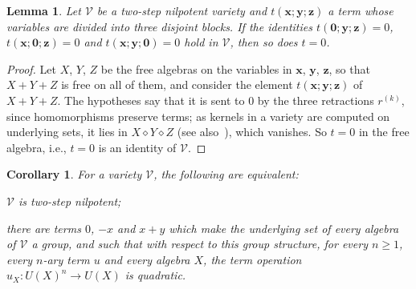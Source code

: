 \documentclass[reqno,a4paper]{amsart}
\theoremstyle{plain}
\newtheorem{lemma}[subsection]{Lemma}
\newtheorem{corollary}[subsection]{Corollary}
\theoremstyle{definition}
\newcommand{\V}{\ensuremath{\mathcal{V}}}
\newcommand{\U}{\ensuremath{U}}
\newcommand{\cosmash}{\ensuremath{\diamond}}
\begin{document}
\begin{lemma}\label{lem:trireduced}
  Let \(\V\) be a two-step nilpotent variety and \(t(\mathbf{x};\mathbf{y};\mathbf{z})\) a term whose variables are divided into three disjoint blocks. If the identities \(t(\mathbf{0};\mathbf{y};\mathbf{z})=0\), \(t(\mathbf{x};\mathbf{0};\mathbf{z})=0\) and \(t(\mathbf{x};\mathbf{y};\mathbf{0})=0\) hold in \(\V\), then so does \(t=0\).
\end{lemma}

\begin{proof}
  Let \(X\), \(Y\), \(Z\) be the free algebras on the variables in \(\mathbf{x}\), \(\mathbf{y}\), \(\mathbf{z}\), so that \(X+Y+Z\) is free on all of them, and consider the element \(t(\mathbf{x};\mathbf{y};\mathbf{z})\) of \(X+Y+Z\). The hypotheses say that it is sent to \(0\) by the three retractions \(r^{(k)}\), since homomorphisms preserve terms; as kernels in a variety are computed on underlying sets, it lies in \(X\cosmash Y\cosmash Z\) (see also~\cite[Example~2.6]{HVdL}), which vanishes. So \(t=0\) in the free algebra, i.e., \(t=0\) is an identity of \(\V\).
\end{proof}

\begin{corollary}\label{cor:quadratic-terms}
  For a variety \(\V\), the following are equivalent:
  \begin{tfae}
    \item\label{it:qt-nil} \(\V\) is two-step nilpotent;
    \item\label{it:qt-quad} there are terms \(0\), \(-x\) and \(x+y\) which make the underlying set of every algebra of \(\V\) a group, and such that with respect to this group structure, for every \(n\geq 1\), every \(n\)-ary term \(u\) and every algebra \(X\), the term operation \(u_{X}\colon \U(X)^{n}\to\U(X)\) is quadratic.
  \end{tfae}
\end{corollary}
\end{document}
